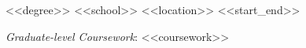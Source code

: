 

\begin{cventries}

  \cventry
    {<<degree>>} %
    {<<school>>} %
    {<<location>>} %
    {<<start_end>>} %
    {
      \begin{cvitems} %
        \item {\textit{Graduate-level Coursework}: <<coursework>> }
      \end{cvitems}
    }
\end{cventries}